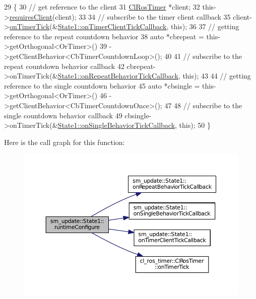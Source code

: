 \begin{DoxyCode}
29     \{
30         \textcolor{comment}{// get reference to the client}
31         \hyperlink{classcl__ros__timer_1_1ClRosTimer}{ClRosTimer} *client;
32         this->\hyperlink{classsmacc_1_1ISmaccState_a7f95c9f0a6ea2d6f18d1aec0519de4ac}{requiresClient}(client);
33 
34         \textcolor{comment}{// subscribe to the timer client callback}
35         client->\hyperlink{classcl__ros__timer_1_1ClRosTimer_a7edcc057bfb5a25fe0892755137dd8da}{onTimerTick}(&\hyperlink{structsm__update_1_1State1_ab4f7a38bc5323775b20ba5e8cc815a18}{State1::onTimerClientTickCallback},
       \textcolor{keyword}{this});
36 
37         \textcolor{comment}{// getting reference to the repeat countdown behavior}
38         \textcolor{keyword}{auto} *cbrepeat = this->getOrthogonal<OrTimer>()
39                              ->getClientBehavior<CbTimerCountdownLoop>();
40 
41         \textcolor{comment}{// subscribe to the repeat countdown behavior callback}
42         cbrepeat->onTimerTick(&\hyperlink{structsm__update_1_1State1_ada025d5bb975eccc8fc7850bbb90f5dc}{State1::onRepeatBehaviorTickCallback}, \textcolor{keyword}{
      this});
43 
44         \textcolor{comment}{// getting reference to the single countdown behavior}
45         \textcolor{keyword}{auto} *cbsingle = this->getOrthogonal<OrTimer>()
46                              ->getClientBehavior<CbTimerCountdownOnce>();
47 
48         \textcolor{comment}{// subscribe to the single countdown behavior callback}
49         cbsingle->onTimerTick(&\hyperlink{structsm__update_1_1State1_a88f30ef150b79e26b3c93a50a8dc1fa1}{State1::onSingleBehaviorTickCallback}, \textcolor{keyword}{
      this});
50     \}
\end{DoxyCode}


Here is the call graph for this function\+:
\nopagebreak
\begin{figure}[H]
\begin{center}
\leavevmode
\includegraphics[width=350pt]{structsm__update_1_1State1_ab41d1931619e35f24f6c7b6e6e6d0316_cgraph}
\end{center}
\end{figure}



